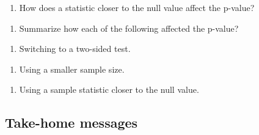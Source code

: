 \documentclass[
]{report}
\providecommand{\tightlist}{%
  \setlength{\itemsep}{0pt}\setlength{\parskip}{0pt}}
\begin{document}
\begin{enumerate}
\def\labelenumi{\arabic{enumi}.}
\setcounter{enumi}{16}
\tightlist
\item
  How does a statistic closer to the null value affect the p-value?
\end{enumerate}

\vspace{0.3in}

\begin{enumerate}
\def\labelenumi{\arabic{enumi}.}
\setcounter{enumi}{17}
\tightlist
\item
  Summarize how each of the following affected the p-value?
\end{enumerate}

\begin{enumerate}
\def\labelenumi{\alph{enumi})}
\tightlist
\item
  Switching to a two-sided test.
\end{enumerate}

\vspace{0.5in}

\begin{enumerate}
\def\labelenumi{\alph{enumi})}
\setcounter{enumi}{1}
\tightlist
\item
  Using a smaller sample size.
\end{enumerate}

\vspace{0.5in}

\begin{enumerate}
\def\labelenumi{\alph{enumi})}
\setcounter{enumi}{2}
\tightlist
\item
  Using a sample statistic closer to the null value.
\end{enumerate}

\vspace{0.5in}

\hypertarget{take-home-messages-11}{%
\subsection{Take-home messages}\label{take-home-messages-11}}
\end{document}

